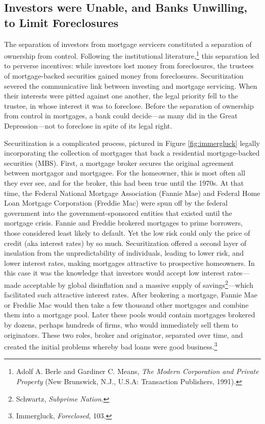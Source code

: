 \documentclass[12pt,oneside]{psthesis}
\begin{document}
\hypertarget{banks}{%
\subsection{Investors were Unable, and Banks Unwilling, to Limit Foreclosures}\label{banks}}

The separation of investors from mortgage servicers constituted a separation of ownership from control.
Following the institutional literature,\footnote{Adolf A. Berle and Gardiner C. Means, \emph{The Modern Corporation and Private Property} (New Brunswick, N.J., U.S.A: Transaction Publishers, 1991).} this separation led to perverse incentives: while investors lost money from foreclosures, the trustees of mortgage-backed securities gained money from foreclosures.
Securitization severed the communicative link between investing and mortgage servicing.
When their interests were pitted against one another, the legal priority fell to the trustee, in whose interest it was to foreclose.
Before the separation of ownership from control in mortgages, a bank could decide---as many did in the Great Depression---not to foreclose in spite of its legal right.

Securitization is a complicated process, pictured in Figure \ref{fig:immergluck} legally incorporating the collection of mortgages that back a residential mortgage-backed securities (MBS).
First, a mortgage broker secures the original agreement between mortgagor and mortgagee.
For the homeowner, this is most often all they ever see, and for the broker, this had been true until the 1970s.
At that time, the Federal National Mortgage Association (Fannie Mae) and Federal Home Loan Mortgage Corporation (Freddie Mac) were spun off by the federal government into the government-sponsored entities that existed until the mortgage crisis.
Fannie and Freddie brokered mortgages to prime borrowers, those considered least likely to default.
Yet the low risk could only the price of credit (aka interest rates) by so much.
Securitization offered a second layer of insulation from the unpredictability of individuals, leading to lower risk, and lower interest rates, making mortgages attractive to prospective homeowners.
In this case it was the knowledge that investors would accept low interest rates---made acceptable by global disinflation and a massive supply of savings\footnote{Schwartz, \emph{Subprime Nation}.}---which facilitated such attractive interest rates.
After brokering a mortgage, Fannie Mae or Freddie Mac would then take a few thousand other mortgages and combine them into a mortgage pool.
Later these pools would contain mortgages brokered by dozens, perhaps hundreds of firms, who would immediately sell them to originators.
These two roles, broker and originator, separated over time, and created the initial problems whereby bad loans were good business.\footnote{Immergluck, \emph{Foreclosed}, 103.}
\end{document}

